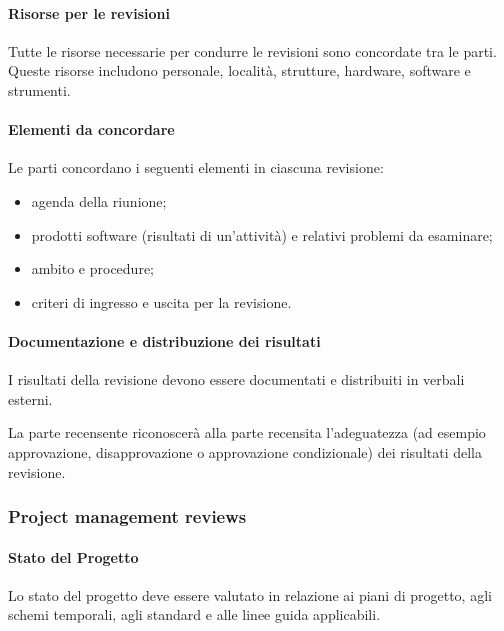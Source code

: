 \paragraph{Risorse per le revisioni}
Tutte le risorse necessarie per condurre le revisioni sono concordate tra le parti. Queste risorse includono personale, località, strutture, hardware, software e strumenti.

\paragraph{Elementi da concordare}
Le parti concordano i seguenti elementi in ciascuna revisione:
\begin{itemize}
    \item 
        agenda della riunione;
    \item 
        prodotti software (risultati di un'attività) e relativi problemi da esaminare;
    \item 
        ambito e procedure;
    \item 
        criteri di ingresso e uscita per la revisione.
\end{itemize}


\paragraph{Documentazione e distribuzione dei risultati}
I risultati della revisione devono essere documentati e distribuiti in verbali esterni.

La parte recensente riconoscerà alla parte recensita l'adeguatezza (ad esempio approvazione, disapprovazione o approvazione condizionale) dei risultati della revisione.

\subsubsection{Project management reviews}

\paragraph{Stato del Progetto}
Lo stato del progetto deve essere valutato in relazione ai piani di progetto, agli schemi temporali, agli standard e alle linee guida applicabili.

